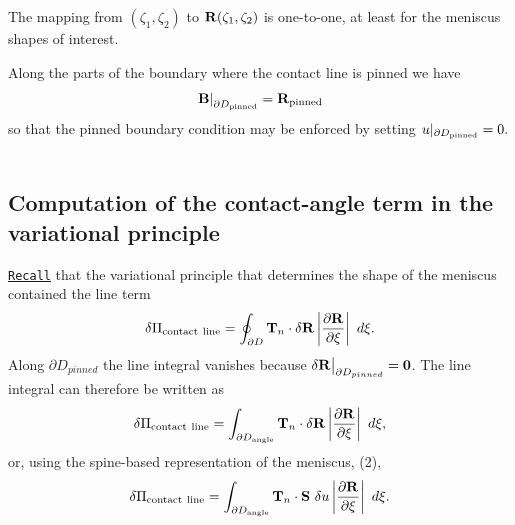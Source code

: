 \begin{DoxyItemize}
\item The mapping from $(\zeta_1,\zeta_2)$ to ${\bf R}(\zeta_1,\zeta_2)$ is one-\/to-\/one, at least for the meniscus shapes of interest. ~\newline
~\newline

\item Along the parts of the boundary where the contact line is pinned we have \[ \left. {\bf B}\right|_{\partial D_{\rm pinned}} = {\bf R}_{\rm pinned} \] so that the pinned boundary condition may be enforced by setting $ u|_{\partial D_{\rm pinned}} = 0.$ ~\newline
~\newline

\end{DoxyItemize}\hypertarget{index_contact_angle_term}{}\subsection{Computation of the contact-\/angle term in the variational principle}\label{index_contact_angle_term}
\href{../../young_laplace/html/index.html}{\tt Recall} that the variational principle that determines the shape of the meniscus contained the line term \[ \delta \Pi_{\rm contact \ line} = \oint_{\partial D } {\bf T}_n \cdot \delta {\bf R} \left| \frac{\partial {\bf R}} {\partial \xi}\right| \ d\xi. \] Along $ \partial D_{pinned} $ the line integral vanishes because $ \delta {\bf R}\big|_{ \partial D_{pinned} } ={\bf 0} $. The line integral can therefore be written as \[ \delta \Pi_{\rm contact \ line} = \int_{\partial D_{\rm angle}} {\bf T}_n \cdot \delta {\bf R} \left| \frac{\partial {\bf R}}{\partial \xi}\right| \ d\xi, \] or, using the spine-\/based representation of the meniscus, (2), \[ \delta \Pi_{\rm contact\ line} = \int_{\partial D_{\rm angle}} {\bf T}_n \cdot {\bf S} \ \delta u \left| \frac{\partial {\bf R}}{\partial \xi}\right| \ d\xi. \]

